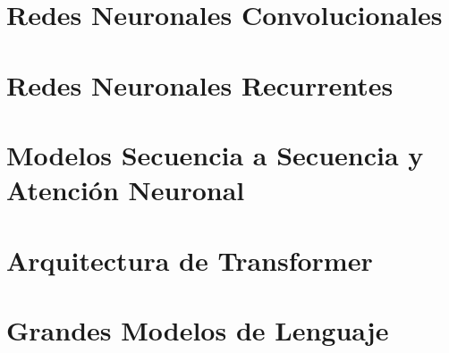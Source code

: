 \documentclass{book}
\begin{document}
\chapter{Redes Neuronales Convolucionales}
\label{cap_cnn}




\chapter{Redes Neuronales Recurrentes}
\label{cap_rnn}



\chapter{Modelos Secuencia a Secuencia y Atención Neuronal}
\label{cap_sec}



\chapter{Arquitectura de Transformer}
\label{cap_trans}




        
        
\chapter{Grandes Modelos de Lenguaje}
\label{cap_llm}









\end{document}
